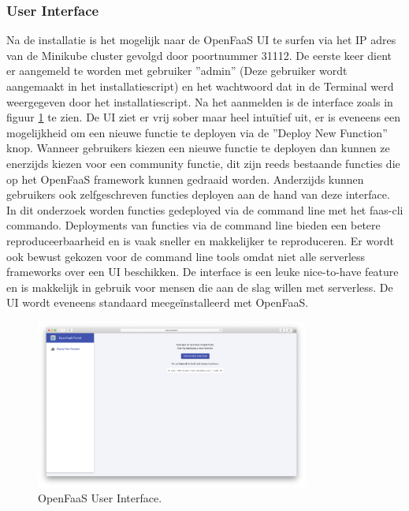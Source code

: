 \subsubsection{User Interface}
Na de installatie is het mogelijk naar de OpenFaaS UI te surfen via het IP adres van de Minikube cluster gevolgd door poortnummer 31112.
De eerste keer dient er aangemeld te worden met gebruiker ''admin'' (Deze gebruiker wordt aangemaakt in het installatiescript) en het wachtwoord dat in de Terminal werd weergegeven door het installatiescript. Na het aanmelden is de interface zoals in figuur \ref{fig:openfaas-ui} te zien. De UI ziet er vrij sober maar heel intuïtief uit, er is eveneens een mogelijkheid om een nieuwe functie te deployen via de ''Deploy New Function'' knop. Wanneer gebruikers kiezen een nieuwe functie te deployen dan kunnen ze enerzijds kiezen voor een community functie, dit zijn reeds bestaande functies die op het OpenFaaS framework kunnen gedraaid worden. Anderzijds kunnen gebruikers ook zelfgeschreven functies deployen aan de hand van deze interface. In dit onderzoek worden functies gedeployed via de command line met het faas-cli commando. Deployments van functies via de command line bieden een betere reproduceerbaarheid en is vaak sneller en makkelijker te reproduceren. Er wordt ook bewust gekozen voor de command line tools omdat niet alle serverless frameworks over een UI beschikken. De interface is een leuke nice-to-have feature en is makkelijk in gebruik voor mensen die aan de slag willen met serverless. De UI wordt eveneens standaard meegeïnstalleerd met OpenFaaS.
\begin{figure}
    \centering
    \includegraphics[width=0.8\textwidth]{img/openfaas-ui.png}
    \caption{OpenFaaS User Interface.}
    \label{fig:openfaas-ui}  
\end{figure}

